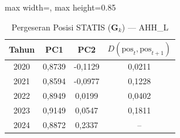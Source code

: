 \begin{table}[H]
\centering
\caption{Pergeseran Posisi STATIS ($\mathbf{G}_k$) --- AHH_L} \label{tab:app2jarak_statis_loading_ahh_l}
\begin{adjustbox}{max width=\textwidth, max height=0.85\textheight}
\begin{tabular}{|c|c|c|c|}
\hline
\textbf{Tahun} & \textbf{PC1} & \textbf{PC2} & \textbf{$D(\text{pos}_t, \text{pos}_{t+1})$} \\
\hline
2020 & 0,8739 & -0,1129 & 0,0211 \\
2021 & 0,8594 & -0,0977 & 0,1228 \\
2022 & 0,8949 & 0,0199 & 0,0402 \\
2023 & 0,9149 & 0,0547 & 0,1811 \\
2024 & 0,8872 & 0,2337 & -- \\
\hline
\end{tabular}
\end{adjustbox}
\end{table}